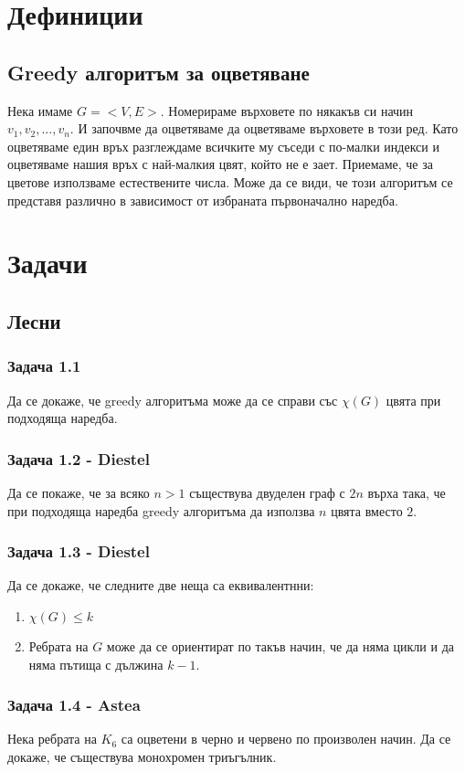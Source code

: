 \documentclass[12pt]{article}
\begin{document}
\section*{Дефиниции}
\subsection*{Greedy алгоритъм за оцветяване}
Нека имаме $G = <V, E>$. Номерираме върховете по някакъв си начин $v_1, v_2, ..., v_{n}$. И започвме да оцветяваме да оцветяваме върховете в този ред. Като оцветяваме един връх разглеждаме всичките му съседи с по-малки индекси и оцветяваме нашия връх с най-малкия цвят, който не е зает. Приемаме, че за цветове използваме естествените числа. Може да се види, че този алгоритъм се представя различно в зависимост от избраната първоначално наредба.

\section*{Задачи}

\subsection*{Лесни} 
\subsubsection*{Задача 1.1}
Да се докаже, че greedy алгоритъма може да се справи със $\chi(G)$ цвята при подходяща наредба.
\subsubsection*{Задача 1.2 - Diestel}
Да се покаже, че за всяко $n > 1$ съществува двуделен граф с $2n$ върха така, че при подходяща наредба greedy алгоритъма да използва $n$ цвята вместо $2$.
\subsubsection*{Задача 1.3 - Diestel}
Да се докаже, че следните две неща са еквивалентнни:
\begin{enumerate}
    \item $\chi(G) \leq k$
    \item Ребрата на $G$ може да се ориентират по такъв начин, че да няма цикли и да няма пътища с дължина $k - 1$.
\end{enumerate}
\subsubsection*{Задача 1.4 - Astea}
Нека ребрата на $K_6$ са оцветени в черно и червено по произволен начин. Да се докаже, че съществува монохромен триъгълник.
\end{document}
